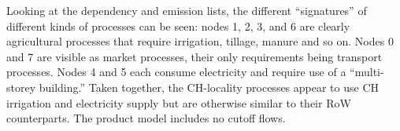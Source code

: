 Looking at the dependency and emission lists, the different ``signatures'' of different kinds of processes can be seen: nodes 1, 2, 3, and 6 are clearly agricultural processes that require irrigation, tillage, manure and so on.  Nodes 0 and 7 are visible as market processes, their only requirements being transport processes.  Nodes 4 and 5 each consume electricity and require use of a ``multi-storey building.''  Taken together, the CH-locality processes appear to use CH irrigation and electricity supply but are otherwise similar to their RoW counterparts.  The product model includes no cutoff flows.

